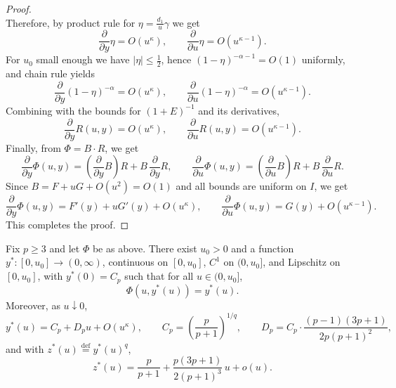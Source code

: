\documentclass{article}
\newcommand\linktoproof[1]{{\hspace{-0.3em}\normalfont[{\hyperlink{proof:#1}{$\downarrow$}}]}}
\newcommand{\defi}{\stackrel{\mathrm{\scriptscriptstyle def}}{=}}
\begin{document}
\begin{proof}
\[    \]
    Therefore, by product rule for $\eta=\frac{d_1}{u}\gamma$ we get
    \[
        \frac{\partial}{\partial y} \eta=O(u^\kappa),\qquad
        \frac{\partial}{\partial u} \eta=O(u^{\kappa-1}).
    \]
    For $u_0$ small enough we have $|\eta|\le \frac12$, hence
    $(1-\eta)^{-\alpha-1}=O(1)$ uniformly, and chain rule yields
    \[
        \frac{\partial}{\partial y} (1-\eta)^{-\alpha}=O(u^\kappa),\qquad
        \frac{\partial}{\partial u} (1-\eta)^{-\alpha}=O(u^{\kappa-1}).
    \]
    Combining with the bounds for $(1+E)^{-1}$ and its derivatives,
    \[
        \frac{\partial}{\partial y} R(u,y)=O(u^\kappa),\qquad
        \frac{\partial}{\partial u} R(u,y)=O(u^{\kappa-1}).
    \]
    Finally, from $\Phi=B\cdot R$, we get 
    \[
        \frac{\partial}{\partial y} \Phi(u,y)=(\frac{\partial}{\partial y} B)R+B\,\frac{\partial}{\partial y} R,\qquad
        \frac{\partial}{\partial u} \Phi(u,y)=(\frac{\partial}{\partial u} B)R+B\,\frac{\partial}{\partial u} R.
    \]
    Since $B=F+uG+O(u^2)=O(1)$ and all bounds are uniform on $I$, we get
    \[
        \frac{\partial}{\partial y} \Phi(u,y)=F'(y)+uG'(y)+O(u^\kappa),\qquad
        \frac{\partial}{\partial u} \Phi(u,y)=G(y)+O(u^{\kappa-1}).
    \]
    This completes the proof.
\end{proof}

\begin{proposition}\label{prop:z-drift}\linktoproof{prop:z-drift}
    Fix $p\ge 3$ and let $\Phi$ be as above.
    There exist $u_0>0$ and a function $y^*:[0,u_0]\to(0,\infty)$,
    continuous on $[0,u_0]$, $C^1$ on $(0,u_0]$, and Lipschitz on $[0,u_0]$, with
    $y^*(0)=C_p$ such that for all $u\in(0,u_0]$,
    \[
        \Phi(u,y^*(u)) = y^*(u).
    \]
    Moreover, as $u\downarrow 0$,
    \[
        y^*(u)= C_p + D_p u + O(u^\kappa),
        \qquad
        C_p = \left(\frac{p}{p+1}\right)^{1/q},
        \qquad
        D_p = C_p\cdot \frac{(p-1)(3p+1)}{2p(p+1)^2},
    \]
    and with $z^*(u) \defi y^*(u)^q$,
    \begin{equation}\label{eq:z-drift}
        z^*(u)=\frac{p}{p+1}+\frac{p(3p+1)}{2(p+1)^3}\,u+o(u).
    \end{equation}
\end{proposition}
\end{document}

